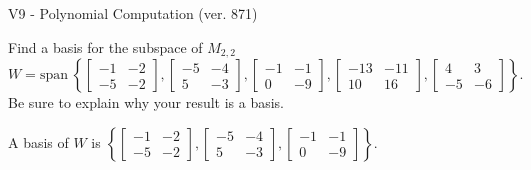\begin{exercise}
  \begin{exerciseTitle}V9 - Polynomial Computation (ver. 871)\end{exerciseTitle}
  \begin{exerciseStatement}
    Find a basis for the subspace of \(M_{2,2}\) 
\[W=\mathrm{span}\ \left\{\left[\begin{array}{cc}
-1 & -2 \\
-5 & -2
\end{array}\right] , \left[\begin{array}{cc}
-5 & -4 \\
5 & -3
\end{array}\right] , \left[\begin{array}{cc}
-1 & -1 \\
0 & -9
\end{array}\right] , \left[\begin{array}{cc}
-13 & -11 \\
10 & 16
\end{array}\right] , \left[\begin{array}{cc}
4 & 3 \\
-5 & -6
\end{array}\right]\right\}.\]
 Be sure to explain why your result is a basis.


  \end{exerciseStatement}
  \begin{exerciseAnswer}
   A basis of \(W\) is  \(\left\{\left[\begin{array}{cc}
-1 & -2 \\
-5 & -2
\end{array}\right] , \left[\begin{array}{cc}
-5 & -4 \\
5 & -3
\end{array}\right] , \left[\begin{array}{cc}
-1 & -1 \\
0 & -9
\end{array}\right]\right\}\).
  


  \end{exerciseAnswer}
\end{exercise}